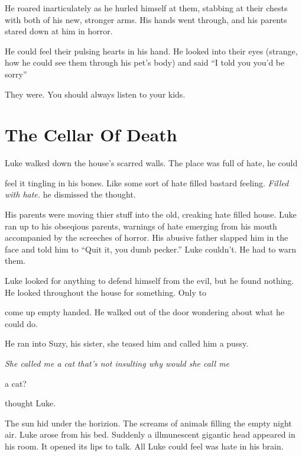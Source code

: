He roared inarticulately as he hurled himself at them, stabbing at
their chests with both of his new, stronger arms. His hands went
through, and his parents stared down at him in horror.



He could feel their pulsing hearts in his hand. He looked into
their eyes (strange, how he could see them through his pet's body)
and said ``I told you you'd be sorry''



They were. You should always listen to your kids. 

 



\chapter{The Cellar Of Death}


Luke walked down the house's scarred walls. The place was full of
hate, he could

feel it tingling in his bones. Like some sort of hate filled
bastard feeling. {\em Filled with hate.} he dismissed the
thought.



His parents were moving thier stuff into the old, creaking hate
filled house. Luke ran up to his obseqious parents, warnings of
hate emerging from his mouth accompanied by the screeches of
horror. His abusive father slapped him in the face and told him to
``Quit it, you dumb pecker.'' Luke couldn't. He had to warn
them.



Luke looked for anything to defend himself from the evil, but he
found nothing. He looked throughout the house for something. Only
to

come up empty handed. He walked out of the door wondering about
what he could do.



He ran into Suzy, his sister, she teased him and called him a
pussy. {\em She called me a cat that's not insulting why would she
call me

a cat?} thought Luke.



The sun hid under the horizion. The screams of animals filling the
empty night air. Luke arose from his bed. Suddenly a illmunescent
gigantic head appeared in his room. It opened its lips to talk. All
Luke could feel was hate in his brain.

